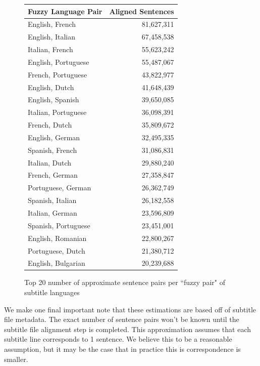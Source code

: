 \documentclass[twoside,twocolumn]{article}
\begin{document}
\begin{figure}[ht]
    \centering
    \begin{tabular}{ |l|r| }
        \hline
        \multicolumn{1}{|c|}{\textbf{Fuzzy Language Pair}} &
            \multicolumn{1}{|c|}{\textbf{Aligned Sentences}} \\
        \hline
        English, French     & 81,627,311 \\ \hline
        English, Italian    & 67,458,538 \\ \hline
        Italian, French     & 55,623,242 \\ \hline
        English, Portuguese & 55,487,067 \\ \hline
        French, Portuguese  & 43,822,977 \\ \hline
        English, Dutch      & 41,648,439 \\ \hline
        English, Spanish    & 39,650,085 \\ \hline
        Italian, Portuguese & 36,098,391 \\ \hline
        French, Dutch       & 35,809,672 \\ \hline
        English, German     & 32,495,335 \\ \hline
        Spanish, French     & 31,086,831 \\ \hline
        Italian, Dutch      & 29,880,240 \\ \hline
        French, German      & 27,358,847 \\ \hline
        Portuguese, German  & 26,362,749 \\ \hline
        Spanish, Italian    & 26,182,558 \\ \hline
        Italian, German     & 23,596,809 \\ \hline
        Spanish, Portuguese & 23,451,001 \\ \hline
        English, Romanian   & 22,800,267 \\ \hline
        Portuguese, Dutch   & 21,380,712 \\ \hline
        English, Bulgarian  & 20,239,688 \\ \hline
    \end{tabular}

    \caption{Top 20 number of approximate sentence pairs per ``fuzzy pair" of
             subtitle languages}
    \label{fig:fuzzy-pair-sentences}
\end{figure}

We make one final important note that these estimations are based off of
subtitle file metadata. The exact number of sentence pairs won't be known until
the subtitle file alignment step is completed. This approximation assumes that
each subtitle line corresponds to 1 sentence. We believe this to be a
reasonable assumption, but it may be the case that in practice this is
correspondence is smaller.
\end{document}

